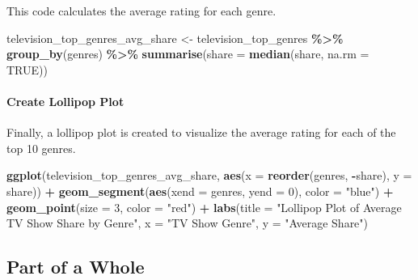 \documentclass[
]{book}
\newenvironment{Shaded}{\begin{snugshade}}{\end{snugshade}}
\newcommand{\AttributeTok}[1]{\textcolor[rgb]{0.13,0.29,0.53}{#1}}
\newcommand{\ConstantTok}[1]{\textcolor[rgb]{0.56,0.35,0.01}{#1}}
\newcommand{\DecValTok}[1]{\textcolor[rgb]{0.00,0.00,0.81}{#1}}
\newcommand{\FunctionTok}[1]{\textcolor[rgb]{0.13,0.29,0.53}{\textbf{#1}}}
\newcommand{\NormalTok}[1]{#1}
\newcommand{\OtherTok}[1]{\textcolor[rgb]{0.56,0.35,0.01}{#1}}
\newcommand{\SpecialCharTok}[1]{\textcolor[rgb]{0.81,0.36,0.00}{\textbf{#1}}}
\newcommand{\StringTok}[1]{\textcolor[rgb]{0.31,0.60,0.02}{#1}}
\begin{document}
This code calculates the average rating for each genre.

\begin{Shaded}
\begin{Highlighting}[]
\NormalTok{television\_top\_genres\_avg\_share }\OtherTok{\textless{}{-}}\NormalTok{ television\_top\_genres }\SpecialCharTok{\%\textgreater{}\%}
  \FunctionTok{group\_by}\NormalTok{(genres) }\SpecialCharTok{\%\textgreater{}\%}
  \FunctionTok{summarise}\NormalTok{(}\AttributeTok{share =} \FunctionTok{median}\NormalTok{(share, }\AttributeTok{na.rm =} \ConstantTok{TRUE}\NormalTok{))}
\end{Highlighting}
\end{Shaded}

\paragraph*{Create Lollipop Plot}\label{create-lollipop-plot}

Finally, a lollipop plot is created to visualize the average rating for each of the top 10 genres.

\begin{Shaded}
\begin{Highlighting}[]
\FunctionTok{ggplot}\NormalTok{(television\_top\_genres\_avg\_share, }\FunctionTok{aes}\NormalTok{(}\AttributeTok{x =} \FunctionTok{reorder}\NormalTok{(genres, }\SpecialCharTok{{-}}\NormalTok{share), }\AttributeTok{y =}\NormalTok{ share)) }\SpecialCharTok{+}
  \FunctionTok{geom\_segment}\NormalTok{(}\FunctionTok{aes}\NormalTok{(}\AttributeTok{xend =}\NormalTok{ genres, }\AttributeTok{yend =} \DecValTok{0}\NormalTok{), }\AttributeTok{color =} \StringTok{"blue"}\NormalTok{) }\SpecialCharTok{+}
  \FunctionTok{geom\_point}\NormalTok{(}\AttributeTok{size =} \DecValTok{3}\NormalTok{, }\AttributeTok{color =} \StringTok{"red"}\NormalTok{) }\SpecialCharTok{+}
  \FunctionTok{labs}\NormalTok{(}\AttributeTok{title =} \StringTok{"Lollipop Plot of Average TV Show Share by Genre"}\NormalTok{,}
       \AttributeTok{x =} \StringTok{"TV Show Genre"}\NormalTok{,}
       \AttributeTok{y =} \StringTok{"Average Share"}\NormalTok{)}
\end{Highlighting}
\end{Shaded}

\subsection*{Part of a Whole}\label{part-of-a-whole}
\end{document}
